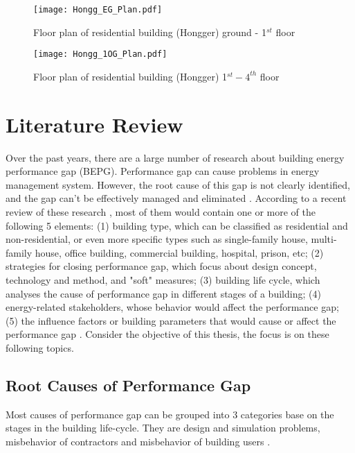 \documentclass[11pt, a4paper]{article}
\theoremstyle{definition}
\begin{document}
		\begin{figure}[H]
		\centering
		\texttt{[image: Hongg\_EG\_Plan.pdf]}
		\caption{Floor plan of residential building (Hongger) ground - 1$^{st}$ floor}
		\label{fig:hongg_eg_plan}
		\end{figure}
		
		\begin{figure}[H]
		\centering
		\texttt{[image: Hongg\_1OG\_Plan.pdf]}
		\caption{Floor plan of residential building (Hongger) 1$^{st} - 4^{th}$ floor}
		\label{fig:hongg_og1_plan}
		\end{figure}
		
\section{Literature Review}

	Over the past years, there are a large number of research about building energy performance gap (BEPG). Performance gap can cause problems in energy management system. However, the root cause of this gap is not clearly identified, and the gap can't be effectively managed and eliminated \cite{FREI2017421}.
	According to a recent review of these research , most of them would contain one or more of the following 5 elements: (1) building type, which can be classified as residential and non-residential, or even more specific types such as single-family house, multi-family house, office building, commercial building, hospital, prison, etc; (2) strategies for closing performance gap, which focus about design concept, technology and method, and "soft" measures; (3) building life cycle, which analyses the cause of performance gap in different stages of a building; (4) energy-related stakeholders, whose behavior would affect the performance gap; (5) the influence factors or building parameters that would cause or affect the performance gap \cite{FREI2017421}. Consider the objective of this thesis, the focus is on these following topics.
	
	\subsection{Root Causes of Performance Gap}
		Most causes of performance gap can be grouped into 3 categories base on the stages in the building life-cycle. They are design and simulation problems, misbehavior of contractors and misbehavior of building users \cite{userevaluations,NIU2016275}.\\
		
\end{document}
